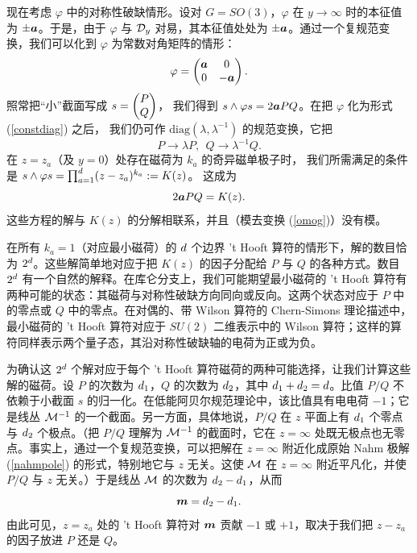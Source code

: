现在考虑 $\varphi$ 中的对称性破缺情形。设对 $G=SO(3)$，$\varphi$ 在 $y\to\infty$ 时的本征值为 $\pm \ca$。于是，由于 $\varphi$ 与 $\D_y$ 对易，其本征值处处为 $\pm \ca$。通过一个复规范变换，我们可以化到 $\varphi$ 为常数对角矩阵的情形：
\begin{equation}\label{constdiag}\varphi=\begin{pmatrix} \ca & 0 \cr 0 & -\ca \end{pmatrix}.\end{equation}
照常把“小”截面写成 $s=\begin{pmatrix}P \cr Q\end{pmatrix}$，
我们得到 $s\wedge \varphi s = 2\ca  PQ$。在把 $\varphi$ 化为形式 (\ref{constdiag}) 之后，
我们仍可作 $\mathrm{diag}(\lambda,\lambda^{-1})$ 的规范变换，它把
\begin{equation}\label{omog}P\to \lambda P,~~Q\to\lambda^{-1} Q.\end{equation}
在 $z=z_a$（及 $y=0$）处存在磁荷为 $k_a$ 的奇异磁单极子时，
我们所需满足的条件是 $s\wedge\varphi s=\prod_{a=1}^\ss (z-z_a)^{k_a}:=K(z)$。
这成为
\begin{equation}\label{counting}
2\ca P Q  = K(z).
\end{equation}
这些方程的解与 $K(z)$ 的分解相联系，并且（模去变换 (\ref{omog})）没有模。

在所有 $k_a=1$（对应最小磁荷）的 $\ss$ 个边界 't Hooft 算符的情形下，解的数目恰为 $2^\ss$。这些解简单地对应于把 $K(z)$ 的因子分配给 $P$ 与 $Q$ 的各种方式。数目 $2^\ss$ 有一个自然的解释。在库仑分支上，我们可能期望最小磁荷的 't Hooft 算符有两种可能的状态：其磁荷与对称性破缺方向同向或反向。这两个状态对应于 $P$ 中的零点或 $Q$ 中的零点。在对偶的、带 Wilson 算符的 Chern-Simons 理论描述中，最小磁荷的 't Hooft 算符对应于 $SU(2)$ 二维表示中的 Wilson 算符；这样的算符同样表示两个量子态，其沿对称性破缺轴的电荷为正或为负。

为确认这 $2^\ss$ 个解对应于每个 't Hooft 算符磁荷的两种可能选择，让我们计算这些解的磁荷。设 $P$ 的次数为 $\ss_1$，$Q$ 的次数为 $\ss_2$，其中 $\ss_1+\ss_2=\ss$。比值 $P/Q$ 不依赖于小截面 $s$ 的归一化。在低能阿贝尔规范理论中，该比值具有电电荷 $-1$；它是线丛 $\M^{-1}$ 的一个截面。另一方面，具体地说，$P/Q$ 在 $z$ 平面上有 $\ss_1$ 个零点与 $\ss_2$ 个极点。（把 $P/Q$ 理解为 $\M^{-1}$ 的截面时，它在 $z=\infty$ 处既无极点也无零点。事实上，通过一个复规范变换，可以把解在 $z=\infty$ 附近化成原始 Nahm 极解 (\ref{nahmpole}) 的形式，特别地它与 $z$ 无关。这使 $\M$ 在 $z=\infty$ 附近平凡化，并使 $P/Q$ 与 $z$ 无关。）于是线丛 $\M$ 的次数为 $\ss_2-\ss_1$，从而
\begin{equation}\label{melf}\m = \ss_2-\ss_1.\end{equation}
由此可见，$z=z_a$ 处的 't Hooft 算符对 $\m$ 贡献 $-1$ 或 $+1$，取决于我们把 $z-z_a$ 的因子放进 $P$ 还是 $Q$。

